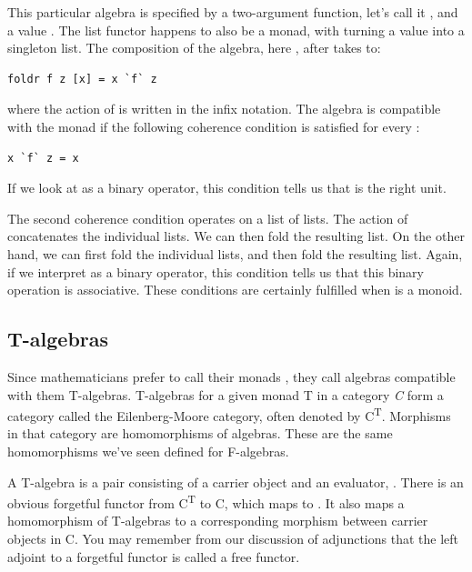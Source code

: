 This particular algebra is specified by a two-argument function, let's
call it , and a value . The list functor happens to
also be a monad, with  turning a value into a singleton
list. The composition of the algebra, here , after
 takes  to:

\begin{verbatim}
foldr f z [x] = x `f` z
\end{verbatim}

where the action of  is written in the infix notation. The
algebra is compatible with the monad if the following coherence
condition is satisfied for every :

\begin{verbatim}
x `f` z = x
\end{verbatim}

If we look at  as a binary operator, this condition tells us
that  is the right unit.

The second coherence condition operates on a list of lists. The action
of  concatenates the individual lists. We can then fold the
resulting list. On the other hand, we can first fold the individual
lists, and then fold the resulting list. Again, if we interpret
 as a binary operator, this condition tells us that this
binary operation is associative. These conditions are certainly
fulfilled when  is a monoid.

\subsection{T-algebras}\label{t-algebras}

Since mathematicians prefer to call their monads , they call
algebras compatible with them T-algebras. T-algebras for a given monad T
in a category \emph{C} form a category called the Eilenberg-Moore
category, often denoted by C\textsuperscript{T}. Morphisms in that
category are homomorphisms of algebras. These are the same homomorphisms
we've seen defined for F-algebras.

A T-algebra is a pair consisting of a carrier object and an evaluator,
. There is an obvious forgetful functor  from
C\textsuperscript{T} to C, which maps  to . It
also maps a homomorphism of T-algebras to a corresponding morphism
between carrier objects in C. You may remember from our discussion of
adjunctions that the left adjoint to a forgetful functor is called a
free functor.

